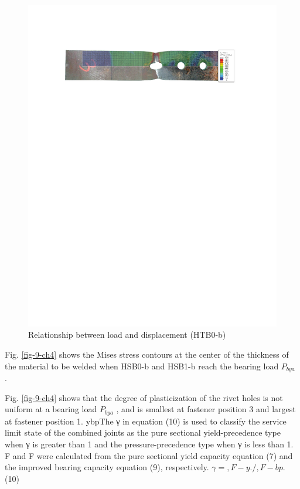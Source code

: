 \begin{figure}
\begin{minipage}[t]{1\textwidth}
    \includegraphics{imgs/ch4/ch4fig10.pdf}
    \caption{Relationship between load and displacement (HTB0-b)}
    \label{ch4fig10}
    \end{minipage}
\end{figure}


Fig. \ref{fig-9-ch4} shows the Mises stress contours at the center of the thickness of the material to be welded when HSB0-b and HSB1-b reach the bearing load $P_{bya}$ .

Fig. \ref{fig-9-ch4} shows that the degree of plasticization of the rivet holes is not uniform at a bearing load $P_{bya}$ , and is smallest at fastener position 3 and largest at fastener position 1. ybpThe γ in equation (10) is used to classify the service limit state of the combined joints as the pure sectional yield-precedence type when γ is greater than 1 and the pressure-precedence type when γ is less than 1. F  and F  were calculated from the pure sectional yield capacity equation (7) and the improved bearing capacity equation (9), respectively.
$γ=,F-y./,F-bp.$ (10)

